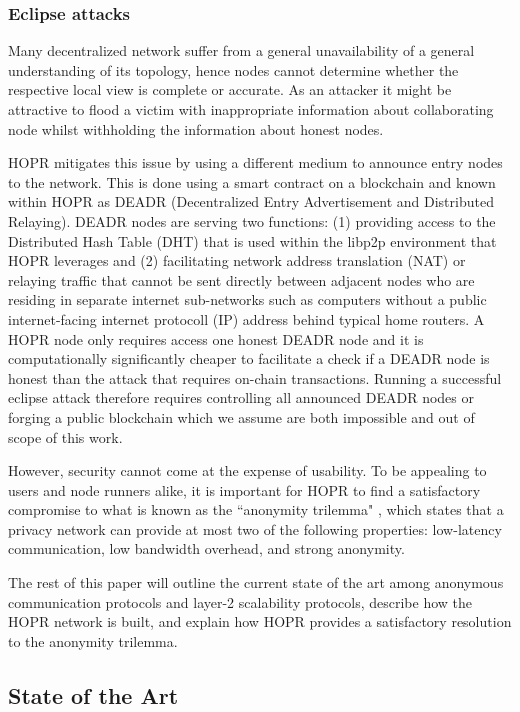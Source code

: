 \subsubsection{Eclipse attacks}
Many decentralized network suffer from a general unavailability of a general understanding of its topology, hence nodes cannot determine whether the respective local view is complete or accurate. As an attacker it might be attractive to flood a victim with inappropriate information about collaborating node whilst withholding the information about honest nodes.

HOPR mitigates this issue by using a different medium to announce entry nodes to the network. This is done using a smart contract on a blockchain and known within HOPR as DEADR (Decentralized Entry Advertisement and Distributed Relaying). DEADR nodes are serving two functions: (1) providing access to the Distributed Hash Table (DHT) that is used within the libp2p environment that HOPR leverages and (2) facilitating network address translation (NAT) or relaying traffic that cannot be sent directly between adjacent nodes who are residing in separate internet sub-networks such as computers without a public internet-facing internet protocoll (IP) address behind typical home routers. A HOPR node only requires access one honest DEADR node and it is computationally significantly cheaper to facilitate a check if a DEADR node is honest than the attack that requires on-chain transactions. Running a successful eclipse attack therefore requires controlling all announced DEADR nodes or forging a public blockchain which we assume are both impossible and out of scope of this work.

However, security cannot come at the expense of usability. To be appealing to users and node runners alike, it is important for HOPR to find a satisfactory compromise to what is known as the ``anonymity trilemma" \cite{AnonymityTrilemma}, which states that a privacy network can provide at most two of the following properties: low-latency communication, low bandwidth overhead, and strong anonymity.

The rest of this paper will outline the current state of the art among anonymous communication protocols and layer-2 scalability protocols, describe how the HOPR network is built, and explain how HOPR provides a satisfactory resolution to the anonymity trilemma.



\subsection{State of the Art}
\label{sec:stateoftheart}


